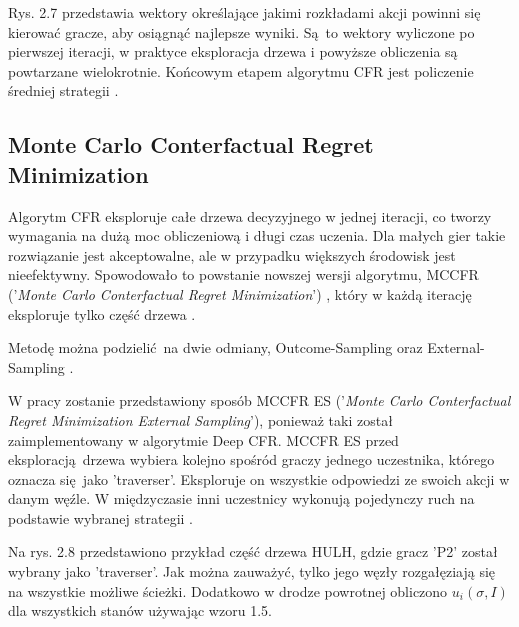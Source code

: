 \documentclass[12pt,oneside,a4paper]{report}
\begin{document}
Rys. 2.7 przedstawia wektory określające jakimi rozkładami akcji powinni się kierować gracze, aby
osiągnąć najlepsze wyniki. Są to wektory wyliczone po pierwszej iteracji, w praktyce eksploracja
drzewa i powyższe obliczenia są powtarzane wielokrotnie. Końcowym etapem algorytmu CFR jest
policzenie średniej strategii \cite{CFR}.





\subsection{Monte Carlo Conterfactual Regret Minimization}

Algorytm CFR eksploruje całe drzewa decyzyjnego w jednej iteracji, co tworzy wymagania na
dużą moc obliczeniową i długi czas uczenia. Dla małych gier takie rozwiązanie jest akceptowalne, ale w przypadku 
większych środowisk jest nieefektywny.
Spowodowało to powstanie nowszej wersji algorytmu, MCCFR ('\emph{Monte Carlo Conterfactual Regret
Minimization}') , 
który w każdą iterację eksploruje tylko część drzewa \cite{mccfr}.

Metodę można podzielić na dwie odmiany, Outcome-Sampling oraz External-Sampling \cite{mccfr}.

W pracy zostanie przedstawiony sposób MCCFR ES ('\emph{Monte Carlo Conterfactual Regret
Minimization External Sampling}'), ponieważ taki został zaimplementowany w algorytmie
Deep CFR.
MCCFR ES przed eksploracją drzewa wybiera kolejno spośród graczy jednego uczestnika, którego 
oznacza
się jako 'traverser'.
Eksploruje on wszystkie odpowiedzi ze swoich akcji w danym węźle. W międzyczasie inni
uczestnicy wykonują pojedynczy ruch na podstawie wybranej strategii \cite{mccfr}.  


Na rys. 2.8 przedstawiono przykład część drzewa HULH, 
gdzie gracz 'P2'
został wybrany jako 'traverser'. 
Jak można zauważyć, tylko jego węzły rozgałęziają się na wszystkie możliwe ścieżki. 
Dodatkowo w drodze powrotnej obliczono $u_{i} (\sigma, I)$ dla wszystkich
stanów używając wzoru 
1.5.
\end{document}
